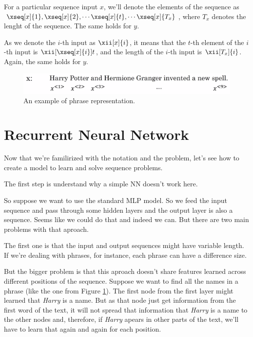 \documentclass[12pt, a4paper, oneside]{book}
\begin{document}
For a particular sequence input $x$, we'll denote the elements of the sequence
as $\xseq[x]{1}, \xseq[x]{2}, \cdots \xseq[x]{t}, \cdots \xseq[x]{T_x}$, where
$T_x$ denotes the lenght of the sequence. The same holds for $y$.

As we denote the $i$-th input as $\xii[x]{i}$, it means that the $t$-th element
of the $i$-th input is $\xii[\xseq[x]{i}]{t}$, and the length of the $i$-th
input is $\xii[T_x]{i}$. Again, the same holds for $y$.

\begin{figure}[h]
\centering
\includegraphics[scale=0.4]{Res/phrase_representation.png}
\caption{An example of phrase representation.}
\label{phrase_representation.png}
\end{figure}

\section{Recurrent Neural Network}%
\label{sec:recurrent_neural_network}

Now that we're familirized with the notation and the problem, let's see how to
create a model to learn and solve sequence problems.

The first step is understand why a simple NN doesn't work here.

So suppose we want to use the standard MLP model. So we feed the input sequence
and pass through some hidden layers and the output layer is also a sequence.
Seems like we could do that and indeed we can. But there are two main problems
with that aproach.

The first one is that the input and output sequences might have variable length.
If we're dealing with phrases, for instance, each phrase can have a difference
size.

But the bigger problem is that this aproach doesn't share features learned
across different positions of the sequence. Suppose we want to find all the
names in a phrase (like the one from Figure \ref{phrase_representation.png}).
The first node from the first layer might learned that \textit{Harry} is a name.
But as that node just get information from the first word of the text, it will
not spread that information that \textit{Harry} is a name to the other nodes
and, therefore, if \textit{Harry} apears in other parts of the text, we'll have
to learn that again and again for each position.
\end{document}
